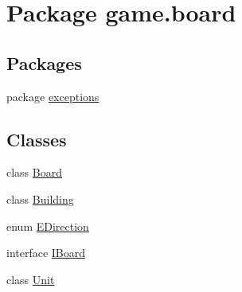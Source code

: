 \hypertarget{namespacegame_1_1board}{}\section{Package game.\+board}
\label{namespacegame_1_1board}
\subsection*{Packages}
\begin{DoxyCompactItemize}
\item 
package \mbox{\hyperlink{namespacegame_1_1board_1_1exceptions}{exceptions}}
\end{DoxyCompactItemize}
\subsection*{Classes}
\begin{DoxyCompactItemize}
\item 
class \mbox{\hyperlink{classgame_1_1board_1_1_board}{Board}}
\item 
class \mbox{\hyperlink{classgame_1_1board_1_1_building}{Building}}
\item 
enum \mbox{\hyperlink{enumgame_1_1board_1_1_e_direction}{E\+Direction}}
\item 
interface \mbox{\hyperlink{interfacegame_1_1board_1_1_i_board}{I\+Board}}
\item 
class \mbox{\hyperlink{classgame_1_1board_1_1_unit}{Unit}}
\end{DoxyCompactItemize}
